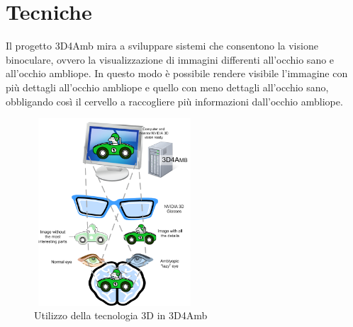 \documentclass[12pt,a4paper,openright,twoside]{book}
\begin{document}
    \section{Tecniche}
    Il progetto 3D4Amb mira a sviluppare sistemi che consentono la visione binoculare, ovvero la visualizzazione di immagini differenti all'occhio sano e all'occhio ambliope. In questo modo è possibile rendere visibile l'immagine con più dettagli all'occhio ambliope e quello con meno dettagli all'occhio sano, obbligando così il cervello a raccogliere più informazioni dall'occhio ambliope.
     \begin{figure}[h]
    	\centering   	
    	\includegraphics[width=6cm, height=7cm]{visione.png}
    	\caption{Utilizzo della tecnologia 3D in 3D4Amb}
    	\label{fig:visione}
    \end{figure}
    \newpage
\end{document}
